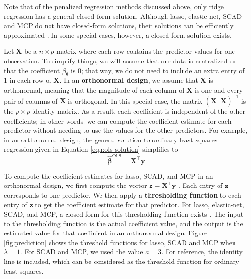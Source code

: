 \documentclass{article}
\begin{document}
Note that of the penalized regression methods discussed above, only ridge regression has a general closed-form solution. Although lasso, elastic-net, SCAD and MCP do not have closed-form solutions, their solutions can be efficiently approximated \cite{friedman2010regularization, breheny2011ncvreg}. In some special cases, however, a closed-form solution exists. 

Let $\mathbf{X}$ be a $n\times p$ matrix where each row contains the predictor values for one observation. To simplify things, we will assume that our data is centralized so that the coefficient $\beta_0$ is 0; that way, we do not need to include an extra entry of 1 in each row of $\mathbf{X}$. In an \textbf{orthonormal design}, we assume that $\mathbf{X}$ is orthonormal, meaning that the magnitude of each column of $\mathbf{X}$ is one and every pair of columns of $\mathbf{X}$ is orthogonal. In this special case, the matrix $(\mathbf{X}^\top \mathbf{X})^{-1}$ is the $p\times p$ identity matrix. As a result, each coefficient is independent of the other coefficients; in other words, we can compute the coefficient estimate for each predictor without needing to use the values for the other predictors. For example, in an orthonormal design, the general solution to ordinary least squares regression given in Equation \ref{eqn:ols-solution} simplifies to
\begin{equation}\label{ols-orthonormal-solution}
	\hat{\bm{\beta}}^{\text{OLS}} = \mathbf{X}^\top \mathbf{y}
\end{equation}

To compute the coefficient estimates for lasso, SCAD, and MCP in an orthonormal design, we first compute the vector $\mathbf{z} = \mathbf{X}^\top \mathbf{y}$ \cite{fan2001variable}. Each entry of $\mathbf{z}$ corresponds to one predictor. We then apply a \textbf{thresholding function} to each entry of $\mathbf{z}$ to get the coefficient estimate for that predictor. For lasso, elastic-net, SCAD, and MCP, a closed-form for this thresholding function exists \cite{tibshirani1996regression, fan2001variable, zou2005regularization, zhang2010nearly}. The input to the thresholding function is the actual coefficient value, and the output is the estimated value for that coefficient in an orthonormal design. Figure \ref{fig:prediction} shows the threshold functions for lasso, SCAD and MCP when $\lambda = 1$. For SCAD and MCP, we used the value $a = 3$. For reference, the identity line is included, which can be considered as the threshold function for ordinary least squares.
\end{document}
